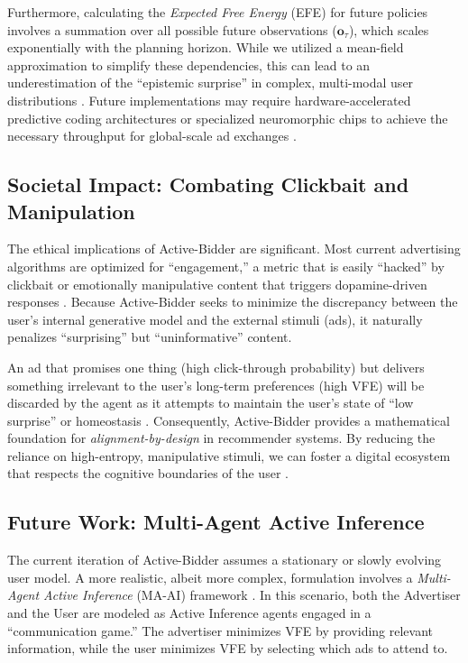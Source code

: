 Furthermore, calculating the \textit{Expected Free Energy} (EFE) for future policies involves a summation over all possible future observations ($\mathbf{o}_{\tau}$), which scales exponentially with the planning horizon. While we utilized a mean-field approximation to simplify these dependencies, this can lead to an underestimation of the ``epistemic surprise'' in complex, multi-modal user distributions \cite{buckley2017free, smith2022active}. Future implementations may require hardware-accelerated predictive coding architectures or specialized neuromorphic chips to achieve the necessary throughput for global-scale ad exchanges \cite{scellier2017equilibrium, davies2024neuromorphic}.

\subsection{Societal Impact: Combating Clickbait and Manipulation}
The ethical implications of Active-Bidder are significant. Most current advertising algorithms are optimized for ``engagement,'' a metric that is easily ``hacked'' by clickbait or emotionally manipulative content that triggers dopamine-driven responses \cite{seaver2019algorithms}. Because Active-Bidder seeks to minimize the discrepancy between the user's internal generative model and the external stimuli (ads), it naturally penalizes ``surprising'' but ``uninformative'' content. 

An ad that promises one thing (high click-through probability) but delivers something irrelevant to the user’s long-term preferences (high VFE) will be discarded by the agent as it attempts to maintain the user's state of ``low surprise'' or homeostasis \cite{constant2022biosemiotics}. Consequently, Active-Bidder provides a mathematical foundation for \textit{alignment-by-design} in recommender systems. By reducing the reliance on high-entropy, manipulative stimuli, we can foster a digital ecosystem that respects the cognitive boundaries of the user \cite{pariser2011filter, hancox2024digital}.

\subsection{Future Work: Multi-Agent Active Inference}
The current iteration of Active-Bidder assumes a stationary or slowly evolving user model. A more realistic, albeit more complex, formulation involves a \textit{Multi-Agent Active Inference} (MA-AI) framework \cite{albarracin2023epistemic}. In this scenario, both the Advertiser and the User are modeled as Active Inference agents engaged in a ``communication game.'' The advertiser minimizes VFE by providing relevant information, while the user minimizes VFE by selecting which ads to attend to.

